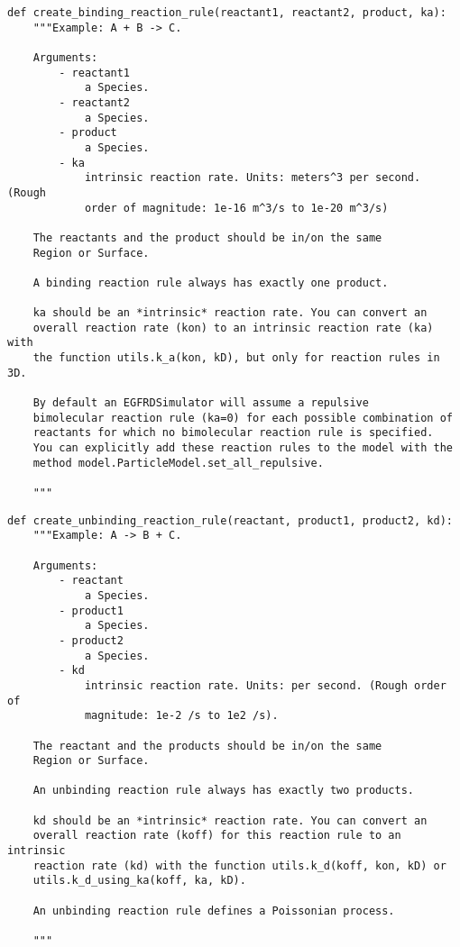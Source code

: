 \documentclass[a4paper,10pt]{article}
\begin{document}
\begin{verbatim}
def create_binding_reaction_rule(reactant1, reactant2, product, ka):
    """Example: A + B -> C.

    Arguments:
        - reactant1
            a Species.
        - reactant2
            a Species.
        - product
            a Species.
        - ka
            intrinsic reaction rate. Units: meters^3 per second. (Rough 
            order of magnitude: 1e-16 m^3/s to 1e-20 m^3/s)

    The reactants and the product should be in/on the same 
    Region or Surface.

    A binding reaction rule always has exactly one product.

    ka should be an *intrinsic* reaction rate. You can convert an 
    overall reaction rate (kon) to an intrinsic reaction rate (ka) with 
    the function utils.k_a(kon, kD), but only for reaction rules in 3D.

    By default an EGFRDSimulator will assume a repulsive 
    bimolecular reaction rule (ka=0) for each possible combination of 
    reactants for which no bimolecular reaction rule is specified. 
    You can explicitly add these reaction rules to the model with the 
    method model.ParticleModel.set_all_repulsive.

    """
\end{verbatim}

\begin{verbatim}
def create_unbinding_reaction_rule(reactant, product1, product2, kd):
    """Example: A -> B + C.

    Arguments:
        - reactant
            a Species.
        - product1
            a Species.
        - product2
            a Species.
        - kd
            intrinsic reaction rate. Units: per second. (Rough order of 
            magnitude: 1e-2 /s to 1e2 /s).

    The reactant and the products should be in/on the same 
    Region or Surface.

    An unbinding reaction rule always has exactly two products.

    kd should be an *intrinsic* reaction rate. You can convert an 
    overall reaction rate (koff) for this reaction rule to an intrinsic 
    reaction rate (kd) with the function utils.k_d(koff, kon, kD) or 
    utils.k_d_using_ka(koff, ka, kD).

    An unbinding reaction rule defines a Poissonian process.

    """
\end{verbatim}
\end{document}
